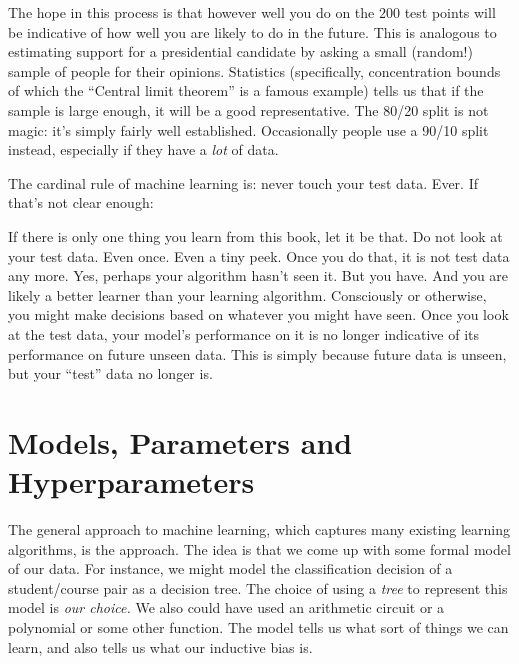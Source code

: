 The hope in this process is that however well you do on the $200$ test
points will be indicative of how well you are likely to do in the
future.  This is analogous to estimating support for a presidential
candidate by asking a small (random!) sample of people for their
opinions.  Statistics (specifically, concentration bounds of which the
``Central limit theorem'' is a famous example) tells us that if the
sample is large enough, it will be a good representative.  The 80/20
split is not magic: it's simply fairly well established.  Occasionally
people use a 90/10 split instead, especially if they have a \emph{lot}
of data.


The cardinal rule of machine learning is: never touch your test data.
Ever.  If that's not clear enough:

\noindent
{}

If there is only one thing you learn from this book, let it be that.
Do not look at your test data.  Even once.  Even a tiny peek.  Once
you do that, it is not test data any more.  Yes, perhaps your
algorithm hasn't seen it.  But you have.  And you are likely a better
learner than your learning algorithm.  Consciously or otherwise, you
might make decisions based on whatever you might have seen.  Once you
look at the test data, your model's performance on it is no longer
indicative of its performance on future unseen data.  This is simply
because future data is unseen, but your ``test'' data no longer is.

\section{Models, Parameters and Hyperparameters}

The general approach to machine learning, which captures many existing
learning algorithms, is the  approach.  The idea is
that we come up with some formal model of our data.  For instance, we
might model the classification decision of a student/course pair as a
decision tree.  The choice of using a \emph{tree} to represent this
model is \emph{our choice.}  We also could have used an arithmetic
circuit or a polynomial or some other function.  The model tells us
what sort of things we can learn, and also tells us what our inductive
bias is.

